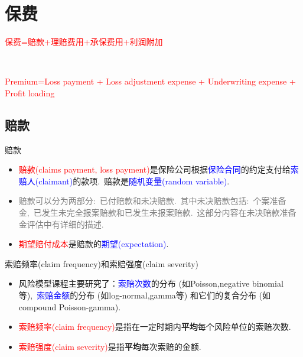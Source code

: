 \documentclass[professionalfont]{beamer}
\newcommand{\red}[1]{\textcolor{red}{#1}}
\newcommand{\green}[1]{\textbf{#1}}
\newcommand{\blue}[1]{\textcolor{blue}{#1}}
\newcommand{\gray}[1]{\textcolor{gray}{#1}}
\begin{document}
\section{保费}
\begin{frame}
	\begin{center}
\red{保费=赔款+理赔费用+承保费用+利润附加}

~

\red{Premium=Loss payment + Loss adjustment expense + Underwriting expense + Profit loading}
	\end{center}
	
\end{frame}
\subsection{赔款}
\begin{frame}{赔款}
\begin{itemize}
	\item \red{赔款(claims payment, loss payment)}是保险公司根据\blue{保险合同}的约定支付给\blue{索赔人(claimant)}的款项.~赔款是\blue{随机变量(random variable)}.
	\item \gray{赔款可以分为两部分:~已付赔款和未决赔款.~其中未决赔款包括:~个案准备金,~已发生未完全报案赔款和已发生未报案赔款.~这部分内容在未决赔款准备金评估中有详细的描述.}
	\item \red{期望赔付成本}是赔款的\blue{期望(expectation)}.

	
\end{itemize}	
\end{frame}
\begin{frame}{索赔频率(claim frequency)和索赔强度(claim severity)}

	\begin{itemize}
	\item 风险模型课程主要研究了：\blue{索赔次数}的分布 (如Poisson,negative binomial等),~\blue{索赔金额}的分布 (如log-normal,gamma等) 和它们的复合分布 (如compound Poisson-gamma).
	\item \red{索赔频率(claim frequency)}是指在一定时期内\green{平均}每个风险单位的索赔次数.
	\item \red{索赔强度(claim severity)}是指\green{平均}每次索赔的金额.

	
	\end{itemize}
\end{frame}
\end{document}
